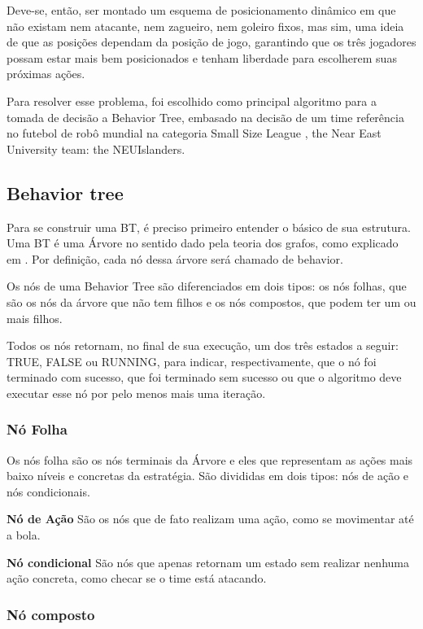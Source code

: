\documentclass[a4paper,12pt]{article}
\begin{document}
Deve-se, então, ser montado um esquema de posicionamento dinâmico em que não existam nem atacante, nem zagueiro, nem goleiro fixos, mas sim, uma ideia de que as posições dependam da posição de jogo, garantindo que os três jogadores possam estar mais bem posicionados e tenham liberdade para escolherem suas próximas ações.

Para resolver esse problema, foi escolhido como principal algoritmo para a tomada de decisão a Behavior Tree, embasado na decisão de um time referência no futebol de robô mundial na categoria Small Size League \cite{ssl}, the Near East University team: the NEUIslanders\cite{NEUIslanders_ssl}.


\subsection{Behavior tree}

Para se construir uma BT, é preciso primeiro entender o básico de sua estrutura. Uma BT é uma Árvore no sentido dado pela teoria dos grafos, como explicado em \cite{west2001introduction}. Por definição, cada nó dessa árvore será chamado de behavior.

Os nós de uma Behavior Tree são diferenciados em dois tipos: os nós folhas, que são os nós da árvore que não tem filhos e os nós compostos, que podem ter um ou mais filhos.

Todos os nós retornam, no final de sua execução, um dos três estados a seguir: TRUE, FALSE ou RUNNING, para indicar, respectivamente, que o nó foi terminado com sucesso, que foi terminado sem sucesso ou que o algoritmo deve executar esse nó por pelo menos mais uma iteração.

\subsubsection{Nó Folha}

Os nós folha são os nós terminais da Árvore e eles que representam as ações mais baixo níveis e concretas da estratégia. São divididas em dois tipos: nós de ação e nós condicionais.

\textbf{Nó de Ação} São os nós que de fato realizam uma ação, como se movimentar até a bola.

\textbf{Nó condicional} São nós que apenas retornam um estado sem realizar nenhuma ação concreta, como checar se o time está atacando.

\subsubsection{Nó composto}
\end{document}
